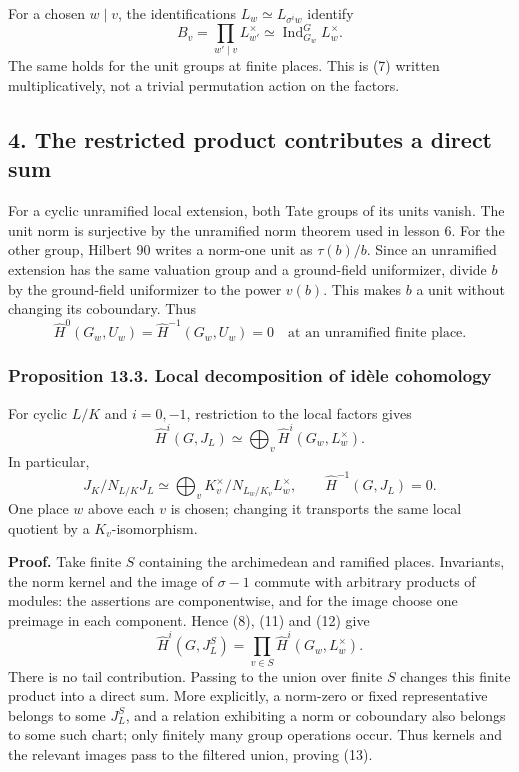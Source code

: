 \documentclass[11pt,a4paper]{article}
\begin{document}
For a chosen \(w\mid v\), the identifications
\(L_w\simeq L_{\sigma^i w}\) identify \[
B_v=\prod_{w'\mid v}L_{w'}^\times
 \simeq\operatorname{Ind}_{G_w}^G L_w^\times.
\tag{11}
\] The same holds for the unit groups at finite places. This is (7)
written multiplicatively, not a trivial permutation action on the
factors.

\subsection{4. The restricted product contributes a direct
sum}\label{the-restricted-product-contributes-a-direct-sum}

For a cyclic unramified local extension, both Tate groups of its units
vanish. The unit norm is surjective by the unramified norm theorem used
in lesson 6. For the other group, Hilbert 90 writes a norm-one unit as
\(\tau(b)/b\). Since an unramified extension has the same valuation
group and a ground-field uniformizer, divide \(b\) by the ground-field
uniformizer to the power \(v(b)\). This makes \(b\) a unit without
changing its coboundary. Thus \[
\widehat H^0(G_w,U_w)=\widehat H^{-1}(G_w,U_w)=0
\quad\text{at an unramified finite place.}
\tag{12}
\]

\subsubsection{Proposition 13.3. Local decomposition of idèle
cohomology}\label{proposition-13.3.-local-decomposition-of-iduxe8le-cohomology}

For cyclic \(L/K\) and \(i=0,-1\), restriction to the local factors
gives \[
\widehat H^i(G,J_L)
\simeq\bigoplus_v\widehat H^i(G_w,L_w^\times).
\tag{13}
\] In particular, \[
J_K/N_{L/K}J_L
\simeq\bigoplus_v K_v^\times/N_{L_w/K_v}L_w^\times,
\qquad
\widehat H^{-1}(G,J_L)=0.
\tag{14}
\] One place \(w\) above each \(v\) is chosen; changing it transports
the same local quotient by a \(K_v\)-isomorphism.

\textbf{Proof.} Take finite \(S\) containing the archimedean and
ramified places. Invariants, the norm kernel and the image of
\(\sigma-1\) commute with arbitrary products of modules: the assertions
are componentwise, and for the image choose one preimage in each
component. Hence (8), (11) and (12) give \[
\widehat H^i(G,J_L^S)
=\prod_{v\in S}\widehat H^i(G_w,L_w^\times).
\tag{15}
\] There is no tail contribution. Passing to the union over finite \(S\)
changes this finite product into a direct sum. More explicitly, a
norm-zero or fixed representative belongs to some \(J_L^S\), and a
relation exhibiting a norm or coboundary also belongs to some such
chart; only finitely many group operations occur. Thus kernels and the
relevant images pass to the filtered union, proving (13).
\end{document}
